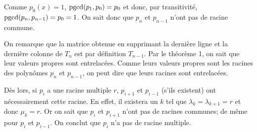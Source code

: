 Comme $p_0(x) = 1$, $\operatorname{pgcd}(p_1,p_0) = p_0$ et donc, par transitivité,
$\operatorname{pgcd}(p_n, p_{n-1}) = p_0 = 1$.
On sait donc que $p_n$ et $p_{n-1}$ n'ont pas de racine commune.


On remarque que la matrice obtenue en supprimant
la dernière ligne et la dernière colonne de $T_n$ est par définition $T_{n-1}$.
Par le théorème 1, on sait que leur valeurs propres sont entrelacées.
Comme leurs valeurs propres sont les racines des polynômes $p_n$ et $p_{n-1}$, on peut dire que leurs racines sont entrelacées.

Dès lors, si $p_i$ a une racine multiple $r$, $p_{i+1}$ et $p_{i-1}$
(s'ils existent) ont nécessairement cette racine.
En effet, il existera un $k$ tel que
$\lambda_k = \lambda_{k+1} = r$ et donc $\mu_{k} = r$.
Or on sait que $p_i$ et $p_{i+1}$ n'ont pas de racines communes;
de même pour $p_i$ et $p_{i-1}$.
On conclut que $p_i$ n'a pas de racine multiple.



